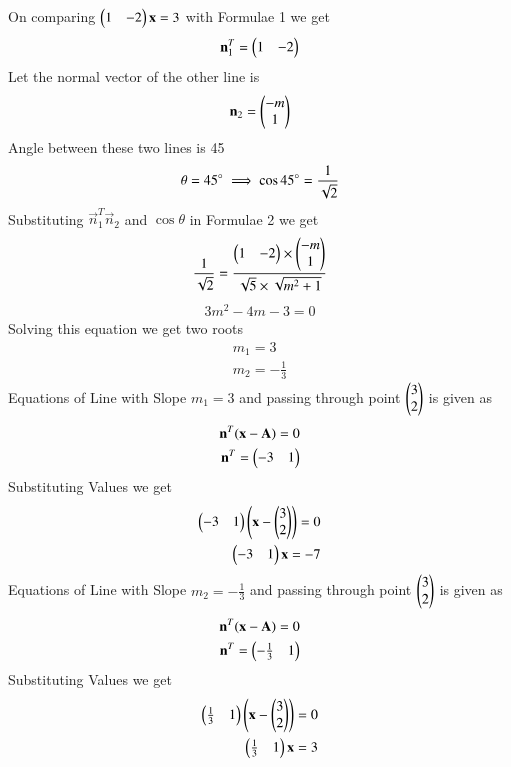 On comparing $\begin{pmatrix}1 & -2\end{pmatrix}\mathbf{x} = 3$ with Formulae 1  we get 
\begin{align}
\mathbf{n}_1^T=\begin{pmatrix}1 & -2\end{pmatrix}
\end{align}
Let the normal vector of the other line is
\begin{align}
\mathbf{n}_2=\begin{pmatrix}-m\\1\end{pmatrix}  
\end{align}
Angle between these two lines is 45\degree
\begin{align}
    \theta=45\degree
    \implies \cos 45\degree &=\frac{1}{\sqrt{2}}\\ 
\end{align}
Substituting $\vec{n}_1^T \vec{n}_2$ and $\cos\theta$ in Formulae 2  we get
\begin{align}
    \frac{1}{\sqrt{2}}=\frac{\begin{pmatrix}1 & -2\end{pmatrix}\times\begin{pmatrix}-m\\1\end{pmatrix}}{\sqrt{5}\times\sqrt{m^2+1}}
\end{align}
\begin{align}
    3m^2-4m-3=0
\end{align}
Solving this equation we get two roots
\begin{align}
m_1=3\\
m_2=-\frac{1}{3}
\end{align}
Equations of Line with Slope $m_1=3$ and passing through point $\begin{pmatrix}3\\2\end{pmatrix}$ is given as
\begin{align}
   \mathbf{n}^T(\mathbf{x}-\mathbf{A})=0\\
   \mathbf{n}^T=\begin{pmatrix}-3 & 1\end{pmatrix}
\end{align}
Substituting Values we get
\begin{align}
 \begin{pmatrix}-3 & 1\end{pmatrix}\left(\mathbf{x}-\begin{pmatrix}3\\2\end{pmatrix}\right)=0\\
 \begin{pmatrix}-3 & 1\end{pmatrix}\mathbf{x}=-7
\end{align}
Equations of Line with Slope $m_2=-\frac{1}{3}$ and passing through point $\begin{pmatrix}3\\2\end{pmatrix}$ is given as
\begin{align}
\mathbf{n}^T(\mathbf{x}-\mathbf{A})=0\\
\mathbf{n}^T=\begin{pmatrix}-\frac{1}{3} & 1\end{pmatrix}
\end{align}
Substituting Values we get
\begin{align}
 \begin{pmatrix}\frac{1}{3} & 1\end{pmatrix}\left(\mathbf{x}-\begin{pmatrix}3\\2\end{pmatrix}\right)=0\\
 \begin{pmatrix}\frac{1}{3} & 1\end{pmatrix}\mathbf{x}=3
\end{align}
